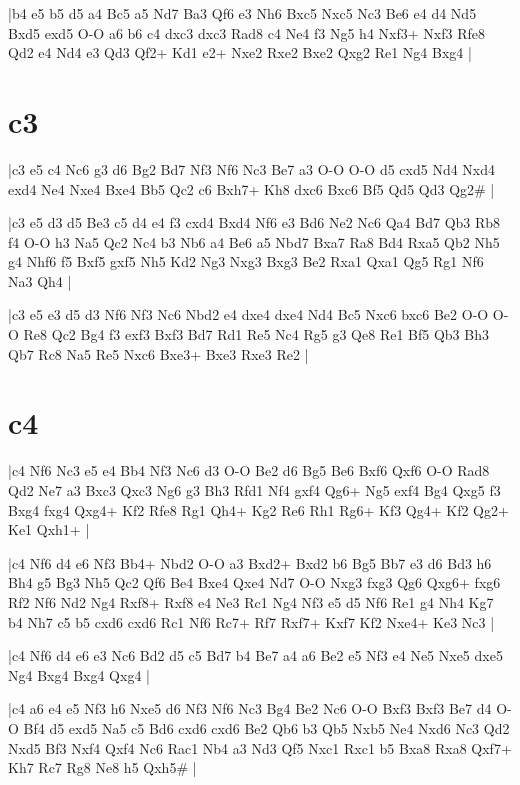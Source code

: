\whitename{}
\blackname{}
\makegametitle
|b4 e5 b5 d5 a4 Bc5 a5 Nd7 Ba3 Qf6 e3 Nh6 Bxc5 Nxc5 Nc3 Be6 e4 d4 Nd5 Bxd5 exd5 O-O a6 b6 c4 dxc3 dxc3 Rad8 c4 Ne4 f3 Ng5 h4 Nxf3+ Nxf3 Rfe8 Qd2 e4 Nd4 e3 Qd3 Qf2+ Kd1 e2+ Nxe2 Rxe2 Bxe2 Qxg2 Re1 Ng4 Bxg4  |

\section{c3}

\whitename{}
\blackname{}
\makegametitle
|c3 e5 c4 Nc6 g3 d6 Bg2 Bd7 Nf3 Nf6 Nc3 Be7 a3 O-O O-O d5 cxd5 Nd4 Nxd4 exd4 Ne4 Nxe4 Bxe4 Bb5 Qc2 c6 Bxh7+ Kh8 dxc6 Bxc6 Bf5 Qd5 Qd3 Qg2\#  |

\whitename{}
\blackname{}
\makegametitle
|c3 e5 d3 d5 Be3 c5 d4 e4 f3 cxd4 Bxd4 Nf6 e3 Bd6 Ne2 Nc6 Qa4 Bd7 Qb3 Rb8 f4 O-O h3 Na5 Qc2 Nc4 b3 Nb6 a4 Be6 a5 Nbd7 Bxa7 Ra8 Bd4 Rxa5 Qb2 Nh5 g4 Nhf6 f5 Bxf5 gxf5 Nh5 Kd2 Ng3 Nxg3 Bxg3 Be2 Rxa1 Qxa1 Qg5 Rg1 Nf6 Na3 Qh4  |

\whitename{}
\blackname{}
\makegametitle
|c3 e5 e3 d5 d3 Nf6 Nf3 Nc6 Nbd2 e4 dxe4 dxe4 Nd4 Bc5 Nxc6 bxc6 Be2 O-O O-O Re8 Qc2 Bg4 f3 exf3 Bxf3 Bd7 Rd1 Re5 Nc4 Rg5 g3 Qe8 Re1 Bf5 Qb3 Bh3 Qb7 Rc8 Na5 Re5 Nxc6 Bxe3+ Bxe3 Rxe3 Re2  |

\section{c4}

\whitename{}
\blackname{}
\makegametitle
|c4 Nf6 Nc3 e5 e4 Bb4 Nf3 Nc6 d3 O-O Be2 d6 Bg5 Be6 Bxf6 Qxf6 O-O Rad8 Qd2 Ne7 a3 Bxc3 Qxc3 Ng6 g3 Bh3 Rfd1 Nf4 gxf4 Qg6+ Ng5 exf4 Bg4 Qxg5 f3 Bxg4 fxg4 Qxg4+ Kf2 Rfe8 Rg1 Qh4+ Kg2 Re6 Rh1 Rg6+ Kf3 Qg4+ Kf2 Qg2+ Ke1 Qxh1+  |

\whitename{}
\blackname{}
\makegametitle
|c4 Nf6 d4 e6 Nf3 Bb4+ Nbd2 O-O a3 Bxd2+ Bxd2 b6 Bg5 Bb7 e3 d6 Bd3 h6 Bh4 g5 Bg3 Nh5 Qc2 Qf6 Be4 Bxe4 Qxe4 Nd7 O-O Nxg3 fxg3 Qg6 Qxg6+ fxg6 Rf2 Nf6 Nd2 Ng4 Rxf8+ Rxf8 e4 Ne3 Rc1 Ng4 Nf3 e5 d5 Nf6 Re1 g4 Nh4 Kg7 b4 Nh7 c5 b5 cxd6 cxd6 Rc1 Nf6 Rc7+ Rf7 Rxf7+ Kxf7 Kf2 Nxe4+ Ke3 Nc3  |

\whitename{}
\blackname{}
\makegametitle
|c4 Nf6 d4 e6 e3 Nc6 Bd2 d5 c5 Bd7 b4 Be7 a4 a6 Be2 e5 Nf3 e4 Ne5 Nxe5 dxe5 Ng4 Bxg4 Bxg4 Qxg4  |

\whitename{}
\blackname{}
\makegametitle
|c4 a6 e4 e5 Nf3 h6 Nxe5 d6 Nf3 Nf6 Nc3 Bg4 Be2 Nc6 O-O Bxf3 Bxf3 Be7 d4 O-O Bf4 d5 exd5 Na5 c5 Bd6 cxd6 cxd6 Be2 Qb6 b3 Qb5 Nxb5 Ne4 Nxd6 Nc3 Qd2 Nxd5 Bf3 Nxf4 Qxf4 Nc6 Rac1 Nb4 a3 Nd3 Qf5 Nxc1 Rxc1 b5 Bxa8 Rxa8 Qxf7+ Kh7 Rc7 Rg8 Ne8 h5 Qxh5\#  |

